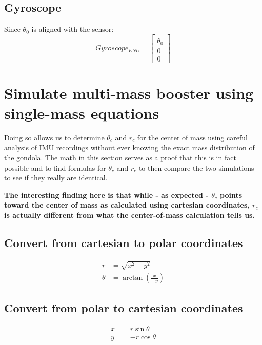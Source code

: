 \documentclass[titlepage]{article}
\numberwithin{equation}{section}
\begin{document}
\subsection{Gyroscope}
Since $\theta_0$ is aligned with the sensor:
\begin{equation}
Gyroscope_{ENU} = \left[ \begin{array}{c}
\dot{\theta_0} \\
0 \\
0
\end{array} \right]
\end{equation}

\section{Simulate multi-mass booster using single-mass equations}
Doing so allows us to determine $\theta_c$ and $r_c$ for the center of mass using careful analysis of IMU recordings without ever knowing the exact mass distribution of the gondola.
The math in this section serves as a proof that this is in fact possible and to find formulas for $\theta_c$ and $r_c$ to then compare the two simulations to see if they really are identical.

\bigskip
\noindent
\textbf{The interesting finding here is that while - as expected - $\theta_c$ points toward the center of mass as calculated using cartesian coordinates, $r_c$ is actually different from what the center-of-mass calculation tells us.}

\subsection{Convert from cartesian to polar coordinates}
\begin{align}
r &= \sqrt{x^2 + y^2} \\
\theta &= \arctan{\left(\frac{x}{-y}\right)}
\end{align}

\subsection{Convert from polar to cartesian coordinates}
\begin{align}
x &= r \sin \theta \\
y &= -r \cos \theta
\end{align}
\end{document}
